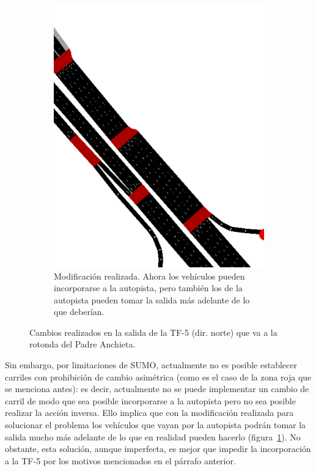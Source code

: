 \begin{figure}[ht]
\begin{subfigure}[t]{0.48\textwidth}
      \includegraphics[width=\textwidth]{report/images/netedit.-tf5-norte-bien.png}
      \caption{Modificación realizada. Ahora los vehículos pueden incorporarse a la autopista, pero también los de la autopista pueden tomar la salida más adelante de lo que deberían.}
      \label{fig:netedit-tf5-norte-bien}
    \end{subfigure}%
    \caption{Cambios realizados en la salida de la TF-5 (dir. norte) que va a la rotonda del Padre Anchieta.}
    \label{fig:netedit-tf5-problema}
\end{figure}

Sin embargo, por limitaciones de SUMO, actualmente no es posible establecer carriles con prohibición de cambio asimétrica (como es el caso de la zona roja que se menciona antes): es decir, actualmente no se puede implementar un cambio de carril de modo que sea posible incorporarse a la autopista pero no sea posible realizar la acción inversa. Ello implica que con la modificación realizada para solucionar el problema los vehículos que vayan por la autopista podrán tomar la salida mucho más adelante de lo que en realidad pueden hacerlo (figura~\ref{fig:netedit-tf5-norte-bien}). No obstante, esta solución, aunque imperfecta, es mejor que impedir la incorporación a la TF-5 por los motivos mencionados en el párrafo anterior.

